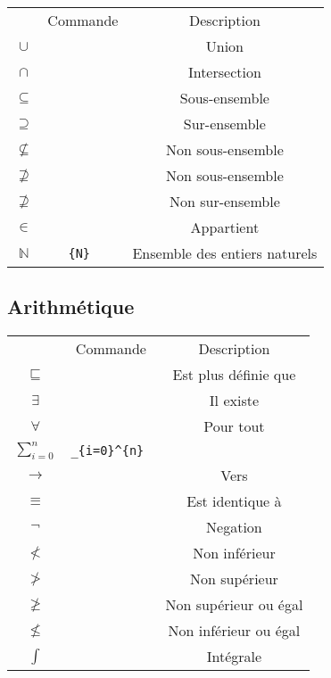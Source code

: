 \documentclass[11pt,a4paper]{article}
\def\X#1{$#1$ &\tt\string#1} %
\begin{document}
	\begin{center}
		\begin{tabu}{|c|c|c|}
			\everyrow{\hline}
			\hline
			 & Commande & Description\\
			\X\cup & Union\\
			\X\cap & Intersection\\
			\X\subseteq & Sous-ensemble\\
			\X\supseteq & Sur-ensemble\\
			\X\nsubseteq & Non sous-ensemble\\
			\X\nsupseteq & Non sous-ensemble\\
			\X\nsupseteq & Non sur-ensemble\\
			\X\in & Appartient\\
			$\mathbb{N}$ & \tt\string\mathbb\{N\} & Ensemble des entiers naturels\\
		\end{tabu}
	\end{center}
	
	\subsection{Arithmétique}
	
	\begin{center}
		\begin{tabu}{|c|c|c|}
			\everyrow{\hline}
			\hline
			 & Commande & Description\\
			\X\sqsubseteq & Est plus définie que\\
			\X\exists & Il existe\\
			\X\forall & Pour tout\\
			$\sum_{i=0}^{n}$ & \tt\string\sum\_\{i=0\}\string^\{n\} &\\
			\X\to & Vers\\
			\X\equiv & Est identique à\\
			\X\neg & Negation\\
			\X\nless  & Non inférieur\\
			\X\ngtr & Non supérieur\\
			\X\ngeqslant & Non supérieur ou égal\\
			\X\nleqslant & Non inférieur ou égal\\
			\X\int & Intégrale\\
		\end{tabu}
	\end{center}
\end{document}
